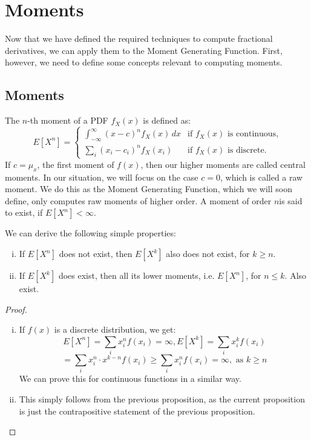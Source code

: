 \section{Moments}
Now that we have defined the required techniques to compute fractional derivatives, we can apply them to the Moment Generating Function. First, however, we need to define some concepts relevant to computing moments.
\subsection{Moments}
\begin{definition}
    The \(n\)-th moment of a PDF \(f_X(x)\) is defined as:
   \[
E[X^n] = 
\begin{cases} 
\int_{-\infty}^{\infty} (x - c)^n f_X(x) \, dx & \text{if } f_X(x) \text{ is continuous,} \\ 
\sum_{i} (x_i - c_ i)^n f_X(x_i) & \text{if } f_X(x) \text{ is discrete.} 
\end{cases}
\]
If \(c = \mu_x\), the first moment of \(f(x)\), then our higher moments are called central moments. In our situation, we will focus on the case \(c = 0\), which is called a raw moment. We do this as the Moment Generating Function, which we will soon define, only computes raw moments of higher order. A moment of order \(n\)is said to exist, if \(E[X^n] < \infty\).
\end{definition}

\begin{proposition}\label{p: moments}
    We can derive the following simple properties:
    \begin{enumerate}[(i)]
        \item If \(E[X^n]\) does not exist, then \(E[X^k]\) also does not exist, for \( k \geq n\).
    
    \item If \(E[X^k]\) does exist, then all its lower moments, i.e. \(E[X^n]\), for \(n \leq k\). Also exist.
\end{enumerate}
\end{proposition}


\begin{proof}
     
    \begin{enumerate}[(i)]
        \item If \(f(x)\) is a discrete distribution, we get: \[E[X^n] = \sum_{i} x_i^n f(x_i) = \infty, E[X^k] = \sum_{i} x_i^k f(x_i)\]
        \[ = \sum_{i} x_i^n \cdot x^{k - n} f(x_i) \geq \sum_{i} x_i^n f(x_i) = \infty, \text{ as } k \geq n\]
        We can prove this for continuous functions in a similar way.
        \item This simply follows from the previous proposition, as the current proposition is just the contrapositive statement of the previous proposition.
    \end{enumerate}
\end{proof}

